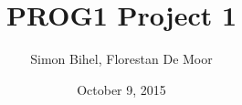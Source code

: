\documentclass{beamer}
\title[Defense]{PROG1 Project 1}
\author{Simon Bihel, Florestan De Moor}
\institute[ENS Rennes]{\texttt{[image: ENS\_Rennes.png]}\\Computer Science Department, 1st year}
\date{October 9, 2015}
\begin{document}
	\begin{frame}
		\maketitle
	\end{frame}
\end{document}

